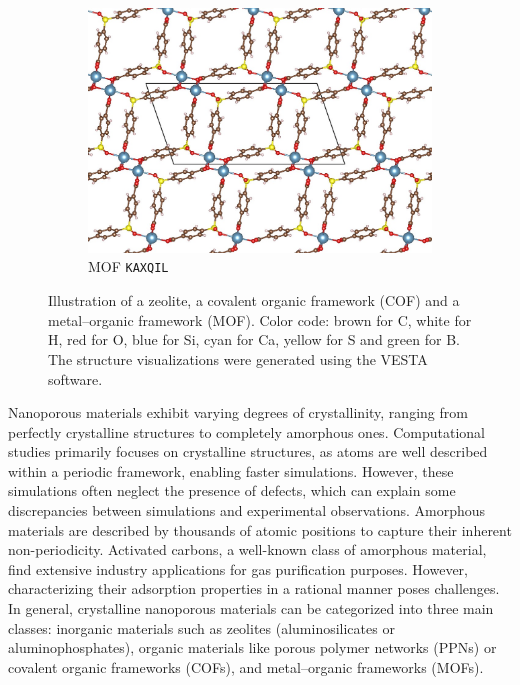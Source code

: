 \documentclass[main.tex]{subfiles}
\begin{document}
\begin{figure}[ht]
\begin{subfigure}[b]{0.32\textwidth}
    \includegraphics[height=0.7\textwidth]{figures/1-screening/SBMOF-1.jpg}
    \caption{MOF \texttt{KAXQIL}~\cite{KAXQIL}}
  \end{subfigure}
  \caption{Illustration of a zeolite, a covalent organic framework (COF) and a metal--organic framework (MOF). Color code: brown for C, white for H, red for O, blue for Si, cyan for Ca, yellow for S and green for B. The structure visualizations were generated using the VESTA software.\autocite{VESTA}}
\end{figure}

Nanoporous materials exhibit varying degrees of crystallinity, ranging from perfectly crystalline structures to completely amorphous ones. Computational studies primarily focuses on crystalline structures, as atoms are well described within a periodic framework, enabling faster simulations. However, these simulations often neglect the presence of defects, which can explain some discrepancies between simulations and experimental observations. Amorphous materials are described by thousands of atomic positions to capture their inherent non-periodicity.\autocite{Thyagarajan_2020} Activated carbons, a well-known class of amorphous material, find extensive industry applications for gas purification purposes. However, characterizing their adsorption properties in a rational manner poses challenges. In general, crystalline nanoporous materials can be categorized into three main classes: inorganic materials such as zeolites (aluminosilicates or aluminophosphates), organic materials like porous polymer networks (PPNs) or covalent organic frameworks (COFs), and metal--organic frameworks (MOFs).
\end{document}
